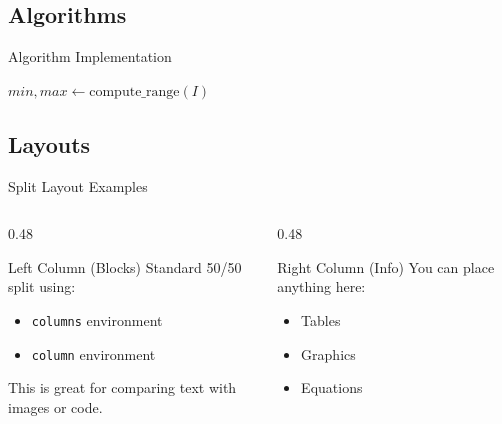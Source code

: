 \subsection{Algorithms}

\begin{frame}{Algorithm Implementation}
    \begin{algorithm}[H]
        \SetAlgoLined
        $min, max \gets \text{compute\_range}(I)$\;
        \caption{Min-Max Normalization}
    \end{algorithm}
\end{frame}

\subsection{Layouts}

\begin{frame}[fragile]{Split Layout Examples}
    \begin{columns}[T] %
        \begin{column}{0.48\textwidth}
            \begin{pblock}{Left Column (Blocks)}
                Standard 50/50 split using:
                \begin{itemize}
                    \item \texttt{columns} environment
                    \item \texttt{column} environment
                \end{itemize}
                This is great for comparing text with images or code.
            \end{pblock}
        \end{column}
        
        \begin{column}{0.48\textwidth}
            \begin{pinfo}{Right Column (Info)}
                You can place anything here:
                \begin{itemize}
                    \item Tables
                    \item Graphics
                    \item Equations
                \end{itemize}
            \end{pinfo}
        \end{column}
    \end{columns}
\end{frame}

